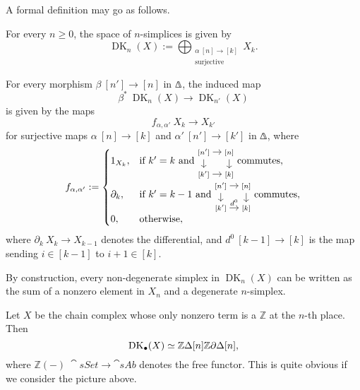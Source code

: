 \begin{construction}
    A formal definition may go as follows. 
    \begin{itms}
        \item For every $n\geq0$, the space of $n$-simplices is given by
        \[\operatorname{DK}_n(X):=\bigoplus_{\substack{\alpha\:[n]\to[k]\\\text{surjective}}}X_k.\]
        \item For every morphism $\beta\:[n']\to[n]$ in $\bfDelta$,
        the induced map
        \[\beta^*\:\operatorname{DK}_{n}(X)\to\operatorname{DK}_{n'}(X)\]
        is given by the maps 
        \[f_{\alpha,\alpha'}\:X_k\to X_{k'}\]
        for surjective maps $\alpha\:[n]\to[k]$ and $\alpha'\:[n']\to[k']$ in $\bfDelta$,
        where 
        \[f_{\alpha,\alpha'}:=\begin{cases}
            1_{X_k}, & \text{if }k'=k\text{ and }
            \begin{tikzcd}[cramped, sep=.9em]
                \scriptstyle[n']\ar[r]\ar[d] & \scriptstyle[n]\ar[d] \\{}
                \scriptstyle[k']\ar[r] & \scriptstyle[k]
            \end{tikzcd}\text{ commutes},\\[15pt]
            \partial_k, & \text{if }k'=k-1\text{ and }
            \begin{tikzcd}[cramped, sep=.9em]
                \scriptstyle[n']\ar[r]\ar[d] & \scriptstyle[n]\ar[d] \\{}
                \scriptstyle[k']\ar[r,"d^0"] & \scriptstyle[k]
            \end{tikzcd}\text{ commutes},\\
            0, & \text{otherwise},
        \end{cases}\]
        where $\partial_k\:X_k\to X_{k-1}$ denotes the differential,
        and $d^0\:[k-1]\to[k]$ is the map sending $i\in[k-1]$ to $i+1\in[k]$. \varqed
    \end{itms}
\end{construction}

By construction, every non-degenerate simplex in $\operatorname{DK}_n(X)$
can be written as the sum of a nonzero element in $X_n$
and a degenerate $n$-simplex.

\begin{example}
    Let $X$ be the chain complex whose only nonzero term
    is a $\mathbb{Z}$ at the $n$-th place. Then 
    \[\operatorname{DK}_\bullet(X)\simeq
    \mathbb{Z}\Delta[n]\/\mathbb{Z}\partial\Delta[n],\]
    where $\mathbb{Z}(-)\:\cat{sSet}\to\cat{sAb}$
    denotes the free functor.
    This is quite obvious if we consider the picture above. \varqed
\end{example}

